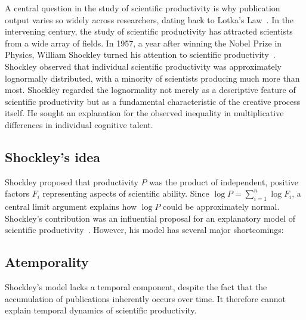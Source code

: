 \documentclass[9pt,twocolumn,twoside]{pnas-new}
\begin{document}


\maketitle
\thispagestyle{firststyle}
\Firstpage
A central question in the study of scientific productivity is why publication output varies so widely across researchers, dating back to Lotka's Law~\cite{origins_of_productivity_frequency_law_lotka1926}. In the intervening century, the study of scientific productivity has attracted scientists from a wide array of fields. In 1957, a year after winning the Nobel Prize in Physics, William Shockley turned his attention to scientific productivity~\cite{product_of_factors_explains_lognormality_shockley1957}. Shockley observed that individual scientific productivity was approximately lognormally distributed, with a minority of scientists producing much more than most. Shockley regarded the lognormality not merely as a descriptive feature of scientific productivity but as a fundamental characteristic of the creative process itself. He sought an explanation for the observed inequality in multiplicative differences in individual cognitive talent.
\subsection*{Shockley's idea}\label{subsec:intro_shockley}
Shockley proposed that productivity $P$ was the product of independent,
positive factors $F_i$ representing aspects of scientific ability.
Since $\log P = \sum_{i=1}^{n}\log F_i$, a central limit argument
explains how $\log P$ could be approximately normal.
Shockley's contribution was an influential proposal for an explanatory model of scientific productivity~\cite{shockley_in_modern_science_of_science_wang2021}. However, his model has several major shortcomings:

\subsection*{Atemporality}\label{subsec:intro_atemp}
Shockley's model lacks a temporal component, despite the fact that the accumulation of publications inherently occurs over time. It therefore cannot explain temporal dynamics of scientific productivity. 
\end{document}
